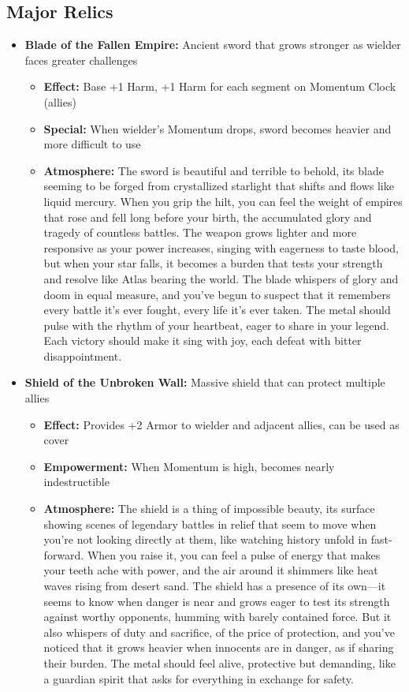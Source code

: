 \documentclass[11pt]{article}
\begin{document}
\subsection{Major Relics}
\begin{itemize}
\item \textbf{Blade of the Fallen Empire:} Ancient sword that grows stronger as wielder faces greater challenges
  \begin{itemize}
  \item \textbf{Effect:} Base +1 Harm, +1 Harm for each segment on Momentum Clock (allies)
  \item \textbf{Special:} When wielder's Momentum drops, sword becomes heavier and more difficult to use
  \item \textbf{Atmosphere:} The sword is beautiful and terrible to behold, its blade seeming to be forged from crystallized starlight that shifts and flows like liquid mercury. When you grip the hilt, you can feel the weight of empires that rose and fell long before your birth, the accumulated glory and tragedy of countless battles. The weapon grows lighter and more responsive as your power increases, singing with eagerness to taste blood, but when your star falls, it becomes a burden that tests your strength and resolve like Atlas bearing the world. The blade whispers of glory and doom in equal measure, and you've begun to suspect that it remembers every battle it's ever fought, every life it's ever taken. The metal should pulse with the rhythm of your heartbeat, eager to share in your legend. Each victory should make it sing with joy, each defeat with bitter disappointment.
  \end{itemize}
\item \textbf{Shield of the Unbroken Wall:} Massive shield that can protect multiple allies
  \begin{itemize}
  \item \textbf{Effect:} Provides +2 Armor to wielder and adjacent allies, can be used as cover
  \item \textbf{Empowerment:} When Momentum is high, becomes nearly indestructible
  \item \textbf{Atmosphere:} The shield is a thing of impossible beauty, its surface showing scenes of legendary battles in relief that seem to move when you're not looking directly at them, like watching history unfold in fast-forward. When you raise it, you can feel a pulse of energy that makes your teeth ache with power, and the air around it shimmers like heat waves rising from desert sand. The shield has a presence of its own—it seems to know when danger is near and grows eager to test its strength against worthy opponents, humming with barely contained force. But it also whispers of duty and sacrifice, of the price of protection, and you've noticed that it grows heavier when innocents are in danger, as if sharing their burden. The metal should feel alive, protective but demanding, like a guardian spirit that asks for everything in exchange for safety.
  \end{itemize}
\end{itemize}
\end{document}

